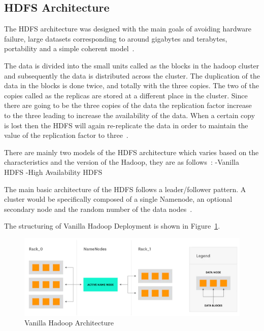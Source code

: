 \subsection{HDFS Architecture}
The HDFS architecture was designed with the main goals of avoiding 
hardware failure, large datasets corresponding to around gigabytes 
and terabytes, portability 
and a simple coherent model~\cite{hid-sp18-412-HDFS-Architecture}.

The data is divided into the small units called as the blocks 
in the hadoop cluster and subsequently the data is distributed 
across the cluster. The duplication of the data in the blocks 
is done twice, and totally with the three copies. The two of 
the copies called as the replicas are stored at a different 
place in the cluster. Since there are going to be the three 
copies of the data the replication factor increase to the three 
leading to increase the availability of the data. When a certain 
copy is lost then the HDFS will again re-replicate the data in 
order to maintain the value of the 
replication factor to three~\cite{hid-sp18-412-hadoop-architecture-overview}.

There are mainly two models of the HDFS architecture 
which varies based on the characteristics and the version 
of the Hadoop, they are 
as follows~\cite{hid-sp18-412-hadoop-architecture-overview}:
-Vanilla HDFS
-High Availability HDFS

The main basic architecture of the HDFS follows a 
leader/follower pattern. A cluster would be 
specifically composed of a single Namenode, 
an optional secondary node and the 
random number of the data nodes~\cite{hid-sp18-412-HDFS-Architecture}.

The structuring of Vanilla Hadoop Deployment is 
shown in Figure~\ref{s:vaniarchi}.

\begin{figure}[!ht]
\centering\includegraphics[width=\textwidth]{images/vanilla.png}
\caption{Vanilla 
Hadoop 
Architecture
~\cite{hid-sp18-412-hadoop-architecture-overview}}\label{s:vaniarchi}
\end{figure}

